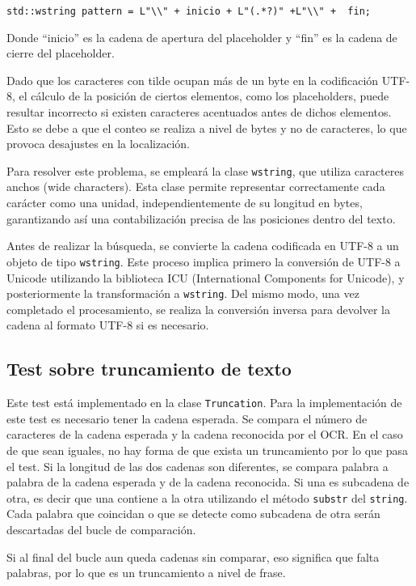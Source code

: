 \verb|std::wstring pattern = L"\\" + inicio + L"(.*?)" +L"\\" +  fin;|

Donde ``inicio'' es la cadena de apertura del placeholder y ``fin'' es la cadena de cierre del placeholder. 

Dado que los caracteres con tilde ocupan más de un byte en la codificación UTF-8, el cálculo de la posición de ciertos elementos, como los placeholders, puede resultar incorrecto si existen caracteres acentuados antes de dichos elementos. Esto se debe a que el conteo se realiza a nivel de bytes y no de caracteres, lo que provoca desajustes en la localización.

Para resolver este problema, se empleará la clase \texttt{wstring}, que utiliza caracteres anchos (wide characters). Esta clase permite representar correctamente cada carácter como una unidad, independientemente de su longitud en bytes, garantizando así una contabilización precisa de las posiciones dentro del texto.

Antes de realizar la búsqueda, se convierte la cadena codificada en UTF-8 a un objeto de tipo \texttt{wstring}. Este proceso implica primero la conversión de UTF-8 a Unicode utilizando la biblioteca ICU (International Components for Unicode), y posteriormente la transformación a \texttt{wstring}. Del mismo modo, una vez completado el procesamiento, se realiza la conversión inversa para devolver la cadena al formato UTF-8 si es necesario.

\subsection{Test sobre truncamiento de texto}
\label{itest:truncamiento}
Este test está implementado en la clase \texttt{Truncation}.
Para la implementación de este test es necesario tener la cadena esperada. Se compara el número de caracteres de la cadena esperada y la cadena reconocida por el OCR. En el caso de que sean iguales, no hay forma de que exista un truncamiento por lo que pasa el test.
Si la longitud de las dos cadenas son diferentes, se compara palabra a palabra de la cadena esperada y de la cadena reconocida. Si una es subcadena de otra, es decir que una contiene a la otra utilizando el método \texttt{substr} del \texttt{string}. Cada palabra que coincidan o que se detecte como subcadena de otra serán descartadas del bucle de comparación.

Si al final del bucle aun queda cadenas sin comparar, eso significa que falta palabras, por lo que es un truncamiento a nivel de frase.
